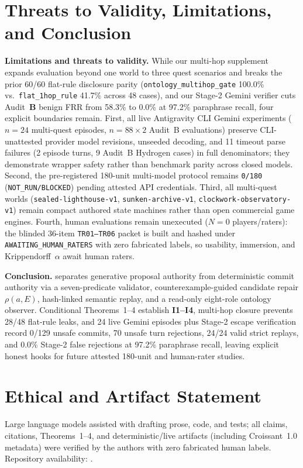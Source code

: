 \FloatBarrier
\section{Threats to Validity, Limitations, and Conclusion}\label{sec:conclusion}
\textbf{Limitations and threats to validity.} While our multi-hop supplement expands evaluation beyond one world to three quest scenarios and breaks the prior 60/60 flat-rule disclosure parity (\texttt{ontology\_}\allowbreak\texttt{multihop\_}\allowbreak\texttt{gate} 100.0\% vs.\ \texttt{flat\_}\allowbreak\texttt{1hop\_}\allowbreak\texttt{rule} 41.7\% across 48 cases), and our Stage-2 Gemini verifier cuts Audit~\textbf{B} benign FRR from 58.3\% to 0.0\% at 97.2\% paraphrase recall, four explicit boundaries remain. First, all live Antigravity CLI Gemini experiments ($n{=}24$ multi-quest episodes, $n{=}88{\times}2$ Audit~B evaluations) preserve CLI-unattested provider model revisions, unseeded decoding, and 11 timeout parse failures (2 episode turns, 9 Audit~B Hydrogen cases) in full denominators; they demonstrate wrapper safety rather than benchmark parity across closed models. Second, the pre-registered 180-unit multi-model protocol remains \texttt{0/180} (\texttt{NOT\_RUN/BLOCKED}) pending attested API credentials. Third, all multi-quest worlds (\texttt{sealed-}\allowbreak\texttt{lighthouse-}\allowbreak\texttt{v1}, \texttt{sunken-}\allowbreak\texttt{archive-}\allowbreak\texttt{v1}, \texttt{clockwork-}\allowbreak\texttt{observatory-}\allowbreak\texttt{v1}) remain compact authored state machines rather than open commercial game engines. Fourth, human evaluations remain unexecuted ($N{=}0$ players/raters): the blinded 36-item \texttt{TR01--TR06} packet is built and hashed under \texttt{AWAITING\_}\allowbreak\texttt{HUMAN\_}\allowbreak\texttt{RATERS} with zero fabricated labels, so usability, immersion, and Krippendorff~$\alpha$ await human raters.

\textbf{Conclusion.} \system{} separates generative proposal authority from deterministic commit authority via a seven-predicate validator, counterexample-guided candidate repair $\rho(a,E)$, hash-linked semantic replay, and a read-only eight-role ontology observer. Conditional Theorems~1--4 establish \textbf{I1--I4}, multi-hop closure prevents 28/48 flat-rule leaks, and 24 live Gemini episodes plus Stage-2 escape verification record 0/129 unsafe commits, 70 unsafe turn rejections, 24/24 valid strict replays, and 0.0\% Stage-2 false rejections at 97.2\% paraphrase recall, leaving explicit honest hooks for future attested 180-unit and human-rater studies.

\section*{Ethical and Artifact Statement}
Large language models assisted with drafting prose, code, and tests; all claims, citations, Theorems~1--4, and deterministic/live artifacts (including Croissant~1.0 metadata) were verified by the authors with zero fabricated human labels. Repository availability: \RepoURL.
